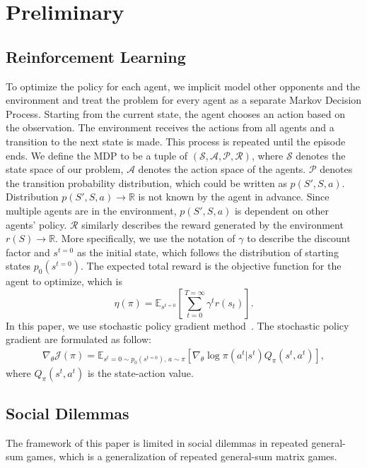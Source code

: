 \documentclass{article}
\begin{document}
\section{Preliminary}
\subsection{Reinforcement Learning}
To optimize the policy for each agent, we implicit model other opponents and the environment
and treat the problem for every agent as a separate Markov Decision Process.
Starting from the current state, the agent chooses an action based on the observation.
The environment receives the actions from all agents and a transition to the next state is made.
This process is repeated until the episode ends.
We define the MDP to be a tuple of
\((\mathcal{S}, \mathcal{A}, \mathcal{P}, \mathcal{R})\),
where \(\mathcal{S}\) denotes the state space of our problem,
\(\mathcal{A}\) denotes the action space of the agents.
\(\mathcal{P}\) denotes the transition probability distribution,
which could be written as \(p(S', S, a)\).
Distribution \(p(S', S, a) \rightarrow \mathbb{R}\) is not known by the agent in advance.
Since multiple agents are in the environment, \(p(S', S, a)\) is dependent on other agents' policy.
\(\mathcal{R}\) similarly describes the reward generated by the environment
\(r(S) \rightarrow \mathbb{R}\).
More specifically, we use the notation of \(\gamma\) to describe the discount factor and
\(s^{t=0}\) as the initial state, which follows the distribution of starting states \(p_0(s^{t=0})\).
The expected total reward is the objective function for the agent to optimize, which is
\begin{equation}\label{equation:objective}
    \eta(\pi) = \mathbb{E}_{s^{t=0}}\left[\sum_{t=0}^{T=\infty}\gamma^t r(s_t)\right].
\end{equation}
In this paper,
we use stochastic policy gradient method~\cite{sutton2000}.
The stochastic policy gradient are formulated as follow:
\begin{equation}\label{spg}
\begin{aligned}
 \nabla_\theta\mathcal{J}(\pi) =
    \mathbb{E}_{s^t=0\sim p_0(s^{t=0}),\,a\sim\pi} \left[\nabla_\theta\log\pi(a^t|s^t) Q_\pi(s^t, a^t)\right],
    \end{aligned}
\end{equation}
where \(Q_\pi(s^t, a^t)\) is the state-action value.
\subsection{Social Dilemmas}
The framework of this paper is limited in social dilemmas in repeated general-sum games,
which is a generalization of repeated general-sum matrix games.
\end{document}
